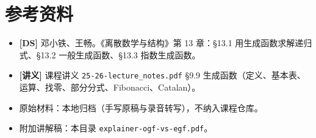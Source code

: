 \documentclass[UTF8,a4paper,11pt]{ctexart}
\begin{document}
\section*{参考资料}
\begin{itemize}
\item \textbf{[DS]} 邓小铁、王畅。《离散数学与结构》第 13 章：§13.1 用生成函数求解递归式、§13.2 一般生成函数、§13.3 指数生成函数。
\item \textbf{[讲义]} 课程讲义 \texttt{25-26-lecture\_notes.pdf} §9.9 生成函数（定义、基本表、运算、找零、部分分式、Fibonacci、Catalan）。
\item 原始材料：本地归档（手写原稿与录音转写），不纳入课程仓库。
\item 附加讲解稿：本目录 \texttt{explainer-ogf-vs-egf.pdf}。
\end{itemize}
\end{document}
